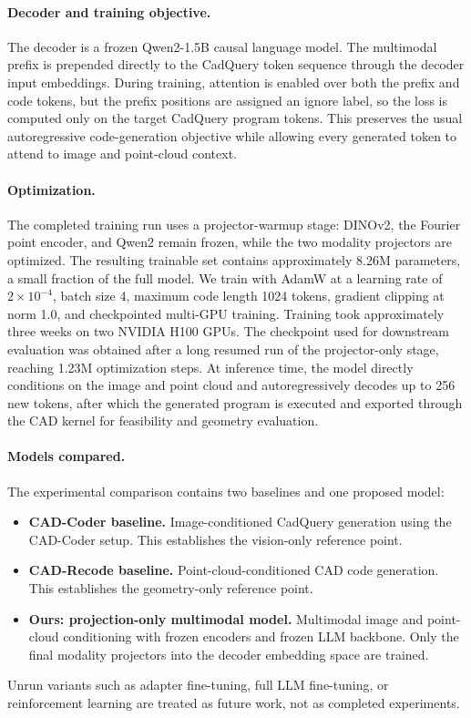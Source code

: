 \documentclass{article}
\begin{document}
\paragraph{Decoder and training objective.}
The decoder is a frozen Qwen2-1.5B causal language model. The multimodal prefix is prepended directly to the CadQuery token sequence through the decoder input embeddings. During training, attention is enabled over both the prefix and code tokens, but the prefix positions are assigned an ignore label, so the loss is computed only on the target CadQuery program tokens. This preserves the usual autoregressive code-generation objective while allowing every generated token to attend to image and point-cloud context.

\paragraph{Optimization.}
The completed training run uses a projector-warmup stage: DINOv2, the Fourier point encoder, and Qwen2 remain frozen, while the two modality projectors are optimized. The resulting trainable set contains approximately 8.26M parameters, a small fraction of the full model. We train with AdamW at a learning rate of $2\times10^{-4}$, batch size 4, maximum code length 1024 tokens, gradient clipping at norm 1.0, and checkpointed multi-GPU training. Training took approximately three weeks on two NVIDIA H100 GPUs. The checkpoint used for downstream evaluation was obtained after a long resumed run of the projector-only stage, reaching 1.23M optimization steps. At inference time, the model directly conditions on the image and point cloud and autoregressively decodes up to 256 new tokens, after which the generated program is executed and exported through the CAD kernel for feasibility and geometry evaluation.

\paragraph{Models compared.}
The experimental comparison contains two baselines and one proposed model:
\begin{itemize}
  \item \textbf{CAD-Coder baseline.} Image-conditioned CadQuery generation using the CAD-Coder setup. This establishes the vision-only reference point.
  \item \textbf{CAD-Recode baseline.} Point-cloud-conditioned CAD code generation. This establishes the geometry-only reference point.
  \item \textbf{Ours: projection-only multimodal model.} Multimodal image and point-cloud conditioning with frozen encoders and frozen LLM backbone. Only the final modality projectors into the decoder embedding space are trained.
\end{itemize}
Unrun variants such as adapter fine-tuning, full LLM fine-tuning, or reinforcement learning are treated as future work, not as completed experiments.
\end{document}
